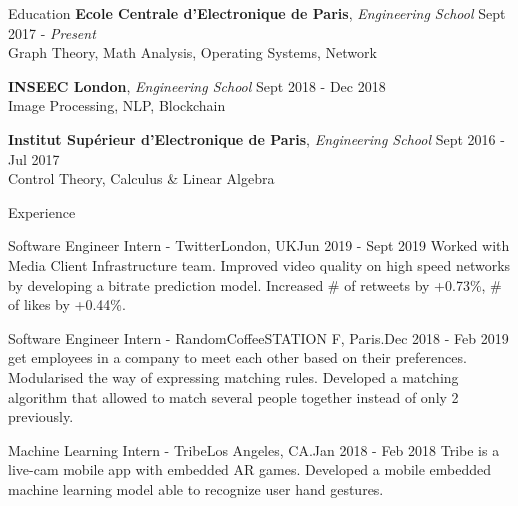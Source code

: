 \documentclass{resume} %
\begin{document}
	\begin{rSection}{Education}
		{\bf Ecole Centrale d'Electronique de Paris}, {\em Engineering School} \hfill {Sept 2017 - \em Present}
		\\ Graph Theory, Math Analysis, Operating Systems, Network

		{\bf INSEEC London}, {\em Engineering School} \hfill {Sept 2018 - Dec 2018}
		\\ Image Processing, NLP, Blockchain

		{\bf Institut Supérieur d'Electronique de Paris}, {\em Engineering School} \hfill {Sept 2016 - Jul 2017}
		\\ Control Theory, Calculus \& Linear Algebra
	\end{rSection}

	\begin{rSection}{Experience}
		\begin{event}{Software Engineer Intern - Twitter}{London, UK}{Jun 2019 - Sept 2019}{
			Worked with Media Client Infrastructure team. Improved video quality on high speed networks by developing a bitrate prediction model. Increased \# of retweets by +0.73\%, \# of likes by +0.44\%.
		}
		\end{event}

		\begin{event}{Software Engineer Intern - RandomCoffee}{STATION F, Paris.}{Dec 2018 - Feb 2019}{
			 get employees in a company to meet each other based on their preferences. Modularised the way of expressing matching rules. Developed a matching algorithm that allowed to match several people together instead of only 2 previously.
		}
		\end{event}

		\begin{event}{Machine Learning Intern - Tribe}{Los Angeles, CA.}{Jan 2018 - Feb 2018}{
			Tribe is a live-cam mobile app with embedded AR games. Developed a mobile embedded machine learning model able to recognize user hand gestures.
		}
		\end{event}
	\end{rSection}
\end{document}
